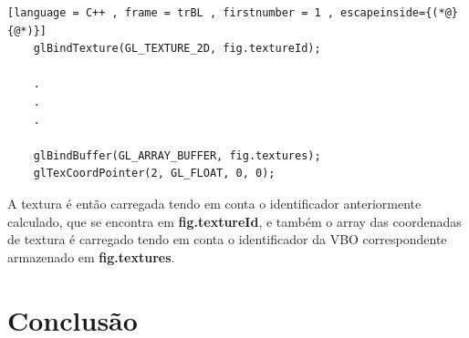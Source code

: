 \documentclass[a4paper]{article}
\begin{document}
\begin{lstlisting}[language = C++ , frame = trBL , firstnumber = 1 , escapeinside={(*@}{@*)}]
	glBindTexture(GL_TEXTURE_2D, fig.textureId);
	
	.
	.
	. 
	
	glBindBuffer(GL_ARRAY_BUFFER, fig.textures);
	glTexCoordPointer(2, GL_FLOAT, 0, 0);
\end{lstlisting}

A textura é então carregada tendo em conta o identificador anteriormente calculado, que se encontra em \textbf{fig.textureId}, e também o array das coordenadas de textura é carregado tendo em conta o identificador da VBO correspondente armazenado em \textbf{fig.textures}. 



\section{Conclusão}
\label{sec:conclusao}
\end{document}
